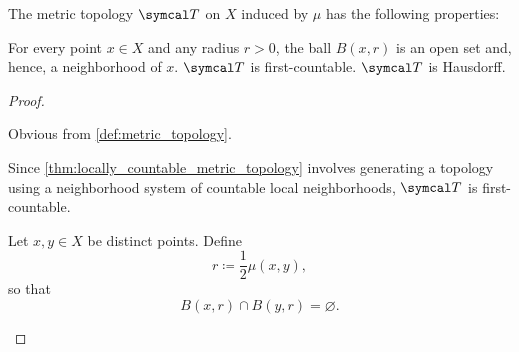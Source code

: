 \begin{proposition}\label{thm:metric_topology_properties}
  The metric topology \( \Cal{T} \) on \( X \) induced by \( \mu \) has the following properties:
  \begin{defenum}
     For every point \( x \in X \) and any radius \( r > 0 \), the ball \( B(x, r) \) is an open set and, hence, a neighborhood of \( x \).
     \( \Cal{T} \) is first-countable.
     \( \Cal{T} \) is Hausdorff.
  \end{defenum}
\end{proposition}
\begin{proof}
  \begin{description}
     Obvious from \cref{def:metric_topology}.

     Since \cref{thm:locally_countable_metric_topology} involves generating a topology using a neighborhood system of countable local neighborhoods, \( \Cal{T} \) is first-countable.

     Let \( x, y \in X \) be distinct points. Define
    \begin{equation*}
      r \coloneqq \dfrac 1 2 \mu(x, y),
    \end{equation*}
    so that
    \begin{equation*}
      B(x, r) \cap B(y, r) = \varnothing.
    \end{equation*}
  \end{description}
\end{proof}

